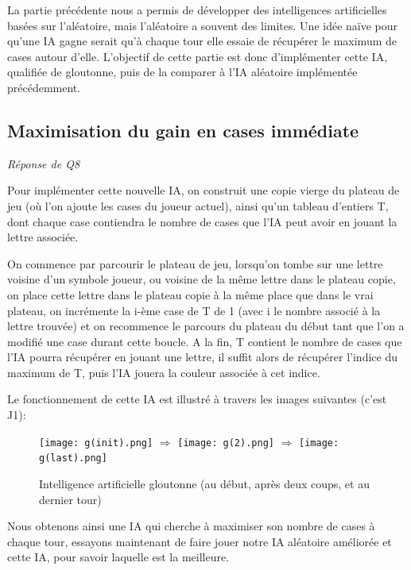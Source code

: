 \documentclass[a4paper,11pt]{article}
\begin{document}
La partie précédente nous a permis de développer des intelligences artificielles
basées sur l'aléatoire, mais l'aléatoire a souvent des limites. Une idée naïve pour
qu'une IA gagne serait qu'à chaque tour elle essaie de récupérer le maximum de cases
autour d'elle. L'objectif de cette partie est donc d'implémenter cette IA, qualifiée 
de gloutonne, puis de la comparer à l'IA aléatoire implémentée précédemment.


\subsection{Maximisation du gain en cases immédiate}
\emph{Réponse de Q8}

Pour implémenter cette nouvelle IA, on construit une copie vierge du plateau de jeu (où l'on ajoute les cases du joueur actuel),
ainsi qu'un tableau d'entiers T, dont chaque case contiendra le nombre de cases que l'IA peut
avoir en jouant la lettre associée. 

On commence par parcourir le plateau de jeu, lorsqu'on tombe sur une lettre voisine
d'un symbole joueur, ou voisine de la même lettre dans le plateau copie, on place cette
lettre dans le plateau copie à la même place que dans le vrai plateau, on incrémente
la i-ème case de T de 1 (avec i le nombre associé à la lettre trouvée) et on 
recommence le parcours du plateau du début tant que l'on a modifié une case durant cette boucle. A la fin, T contient le nombre de cases
que l'IA pourra récupérer en jouant une lettre, il suffit alors de récupérer l'indice
du maximum de T, puis l'IA jouera la couleur associée à cet indice. 

Le fonctionnement de cette IA est illustré à travers les images suivantes (c'est J1):

\begin{figure}[!h]
\begin{center}
\texttt{[image: g(init).png]}
{\Huge
\begin{math}
\Rightarrow
\end{math}}
\texttt{[image: g(2).png]}
{\Huge
\begin{math}
\Rightarrow
\end{math}}
\texttt{[image: g(last).png]}
\caption{Intelligence artificielle gloutonne (au début, après deux coups, et au dernier tour)}
\end{center}
\end{figure}

Nous obtenons ainsi une IA qui cherche à maximiser son nombre de cases à chaque tour,
essayons maintenant de faire jouer notre IA aléatoire améliorée et cette IA, pour
savoir laquelle est la meilleure.
\end{document}
